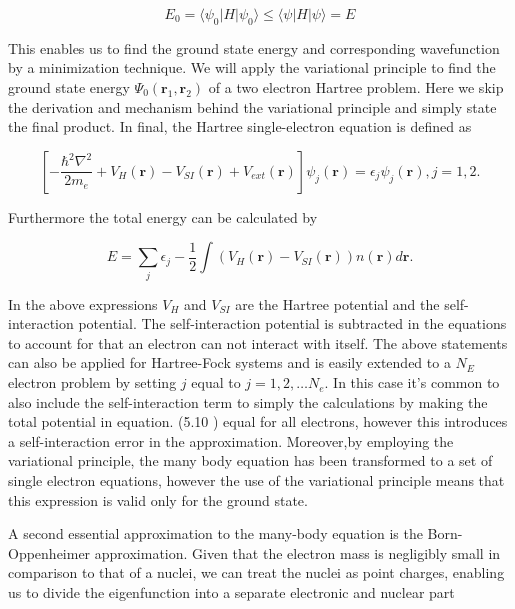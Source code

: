 \begin{equation}
    E_0 = \langle\psi_0|H|\psi_0\rangle \leq \langle\psi|H|\psi\rangle = E
\end{equation}

This enables us to find the ground state energy and corresponding wavefunction by a minimization technique. We will apply the variational principle to find the ground state energy $\Psi_0(\boldsymbol{r}_1, \boldsymbol{r}_2)$ of a two electron Hartree problem. Here we skip the derivation and mechanism behind the variational principle and simply state the final product. In final, the Hartree single-electron equation is defined as

\begin{equation}
\left[ -\frac{\hbar^2\nabla^2}{2m_e} + V_H(\boldsymbol{r}) - V_{SI}(\boldsymbol{r}) + V_{ext}(\boldsymbol{r}) \right] \psi_j(\boldsymbol{r}) = \epsilon_j \psi_j(\boldsymbol{r}), j = 1, 2.
\end{equation}
 
Furthermore the total energy can be calculated by
 
\begin{equation}
E = \sum_j \epsilon_j - \frac{1}{2} \int \left( V_H(\boldsymbol{r}) - V_{SI}(\boldsymbol{r}) \right) n(\boldsymbol{r})d\boldsymbol{r}.
\end{equation} 
 
In the above expressions $V_H$ and $V_{SI}$ are the Hartree potential and the self-interaction potential. The self-interaction potential is subtracted in the equations to account for that an electron can not interact with itself. The above statements can also be applied for Hartree-Fock systems and is easily extended to a $N_E$ electron problem by setting $j$ equal to $j = 1, 2, \dots N_e$. In this case it's common to also include the self-interaction term to simply the calculations by making the total potential in equation. (5.10 ) equal for all electrons, however this introduces a self-interaction error in the approximation. Moreover,by employing the variational principle, the many body equation has been transformed to a set of single electron equations, however the use of the variational principle means that this expression is valid only for the ground state. 

A second essential approximation to the many-body equation is the Born-Oppenheimer approximation. Given that the electron mass is negligibly small in comparison to that of a nuclei, we can treat the nuclei as point charges, enabling us to divide the eigenfunction into a separate electronic and nuclear part

